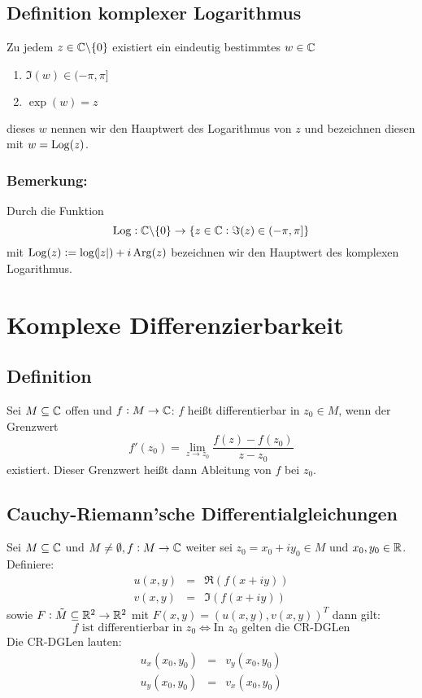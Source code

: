 \subsection{Definition komplexer Logarithmus}
Zu jedem $z \in \mathbb{C} \backslash \{0\}$ existiert ein eindeutig bestimmtes $w \in \mathbb{C}$
\begin{enumerate}
    \item $\Im(w) \in (-\pi, \pi]$
    \item $\exp(w) = z$
\end{enumerate}
dieses $w$ nennen wir den Hauptwert des Logarithmus von $z$ und bezeichnen diesen mit $w = \operatorname{Log}(z)$.

\subsubsection{Bemerkung:}
Durch die Funktion
\begin{equation*}
    \operatorname{Log}: \mathbb{C} \backslash \{0\} \to \{z \in \mathbb{C}: \Im(z) \in (-\pi, \pi]\}
\end{equation*}
mit $\operatorname{Log}(z) := \log(\abs{z}) + i \operatorname{Arg}(z)$ bezeichnen wir den Hauptwert des komplexen Logarithmus.

\section{Komplexe Differenzierbarkeit}
\subsection{Definition}
Sei $M \subseteq \mathbb{C}$ offen und $f: M \to \mathbb{C}$:
$f$ heißt differentierbar in $z_0 \in M$, wenn der Grenzwert
\begin{equation*}
    f'(z_0) = \lim_{z \to z_0} \frac{f(z)- f(z_0)}{z-z_0}
\end{equation*}
existiert. Dieser Grenzwert heißt dann Ableitung von $f$ bei $z_0$.

\subsection{Cauchy-Riemann'sche Differentialgleichungen}
Sei $M \subseteq \mathbb{C}$ und $M \neq \emptyset, f:M \to \mathbb{C}$ weiter sei $z_0 = x_0 + i y_0 \in M$ und $x_0, y_0 \in \mathbb{R}$.
Definiere:
\begin{eqnarray*}
    u(x,y) &=& \Re(f(x+iy)) \\
    v(x,y) &=& \Im(f(x+iy))
\end{eqnarray*}
sowie $F: \tilde{M} \subseteq \mathbb{R}^2 \to \mathbb{R}^2$ mit $F(x,y) = (u(x,y), v(x,y))^T$ dann gilt:
\begin{equation*}
    f \text{ ist differentierbar in } z_0 \Leftrightarrow \text{In } z_0 \text{ gelten die CR-DGLen}
\end{equation*}
Die CR-DGLen lauten:
\begin{eqnarray*}
    u_x(x_0, y_0) &=& v_y(x_0, y_0) \\
    u_y(x_0, y_0) &=& v_x(x_0, y_0)
\end{eqnarray*}

